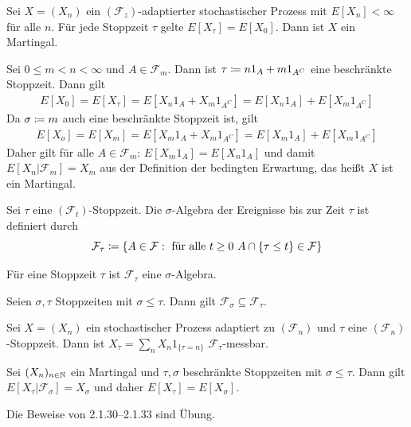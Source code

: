 \documentclass[a4paper,twoside,DIV15,BCOR12mm]{scrbook}
\newcommand{\cF}{\mathcal F}
\begin{document}
\begin{satz}
Sei $X=(X_n)$ ein $(\cF_z)$-adaptierter stochastischer Prozess mit $E[X_n]<\infty$ für alle $n$. Für jede Stoppzeit $\tau$ gelte $E[X_\tau]=E[X_0]$. Dann ist $X$ ein Martingal.
\end{satz}

\begin{beweis}
Sei $0\leq m<n<\infty$ und $A\in \cF_m$. Dann ist $\tau\da n 1_A+m 1_{A^C}$ eine beschränkte Stoppzeit. Dann gilt
\begin{align*}
E[X_0]=E[X_\tau]=E[X_n 1_A+X_m 1_{A^C}]=E[X_n1_A]+E[X_m1_{A^C}]
\end{align*}
Da $\sigma\da m$ auch eine beschränkte Stoppzeit ist, gilt
\begin{align*}
E[X_o]=E[X_m]=E[X_m 1_A+X_m 1_{A^C}]=E[X_m1_A]+E[X_m1_{A^C}]
\end{align*}
Daher gilt für alle $A\in \cF_m$: $E[X_m1_A]=E[X_n1_A]$ und damit $E[X_n|\cF_m]=X_m$ aus der Definition der bedingten Erwartung, das heißt $X$ ist ein Martingal. 
\end{beweis}

\begin{definition}
Sei $\tau$ eine $(\cF_t)$-Stoppzeit. Die $\sigma$-Algebra der Ereignisse bis zur Zeit $\tau$ ist definiert durch 
\[
\cF_\tau\da \{A\in \cF: \mbox{ für alle } t\geq0 \mbox{ } A\cap\{\tau\leq t\}\in \cF\}
\]

\end{definition}

\begin{lemma}
Für eine Stoppzeit $\tau$ ist $\cF_\tau$ eine $\sigma$-Algebra.
\end{lemma}

\begin{lemma}
Seien $\sigma,\tau$ Stoppzeiten mit $\sigma \leq \tau$. Dann gilt $\cF_\sigma\subseteq\cF_\tau$.
\end{lemma}

\begin{lemma}
Sei $X=(X_n)$ ein stochastischer Prozess adaptiert zu $(\cF_n)$ und $\tau$ eine $(\cF_n)$-Stoppzeit. Dann ist $X_\tau=\sum\limits_nX_n1_{\{\tau=n\}}$ $\cF_\tau$-messbar.
\end{lemma}

\begin{satz}
\label{satz:2.1.33}Sei $(X_n)_{n\in\mathbb{N}}$ ein Martingal und $\tau,\sigma$ beschränkte Stoppzeiten mit $\sigma\leq\tau$. Dann gilt $E[X_\tau|\cF_\sigma]=X_\sigma$ und daher $E[X_\tau]=E[X_\sigma]$.
\end{satz}
\begin{beweis}
Die Beweise von 2.1.30--2.1.33 sind \"Ubung.
\end{beweis}
\end{document}
